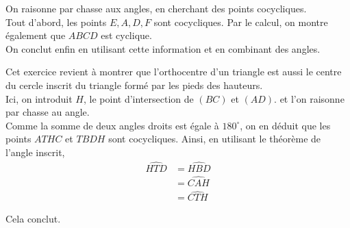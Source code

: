\begin{sol}
On raisonne par chasse aux angles, en cherchant des points cocycliques. \\
Tout d'abord, les points $E, A, D, F$ sont cocycliques. Par le calcul, on montre également que $ABCD$ est cyclique. \\
On conclut enfin en utilisant cette information et en combinant des angles.
\end{sol}


\begin{sol}
Cet exercice revient à montrer que l'orthocentre d'un triangle est aussi le centre du cercle inscrit du triangle formé par les pieds des hauteurs. \\
Ici, on introduit $H$, le point d'intersection de $(BC)$ et $(AD)$. et l'on raisonne par chasse au angle. \\
Comme la somme de deux angles droits est égale à $180^\circ$, on en déduit que les points $ATHC$ et $TBDH$ sont cocycliques. Ainsi, en utilisant le théorème de l'angle inscrit,
\begin{align*}
\widehat{HTD} &= \widehat{HBD} \\ &= \widehat{CAH} \\ &= \widehat{CTH}
\end{align*}

Cela conclut.


\end{sol}
